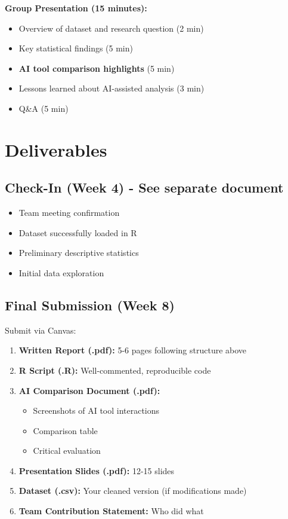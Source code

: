 \documentclass[11pt]{article}
\begin{document}
\textbf{Group Presentation (15 minutes):}
\begin{itemize}
\item Overview of dataset and research question (2 min)
\item Key statistical findings (5 min)
\item \textbf{AI tool comparison highlights} (5 min)
\item Lessons learned about AI-assisted analysis (3 min)
\item Q\&A (5 min)
\end{itemize}

\section{Deliverables}

\subsection{Check-In (Week 4) - See separate document}
\begin{itemize}
\item Team meeting confirmation
\item Dataset successfully loaded in R
\item Preliminary descriptive statistics
\item Initial data exploration
\end{itemize}

\subsection{Final Submission (Week 8)}

Submit via Canvas:

\begin{enumerate}
\item \textbf{Written Report (.pdf):} 5-6 pages following structure above
\item \textbf{R Script (.R):} Well-commented, reproducible code
\item \textbf{AI Comparison Document (.pdf):}
   \begin{itemize}
   \item Screenshots of AI tool interactions
   \item Comparison table
   \item Critical evaluation
   \end{itemize}
\item \textbf{Presentation Slides (.pdf):} 12-15 slides
\item \textbf{Dataset (.csv):} Your cleaned version (if modifications made)
\item \textbf{Team Contribution Statement:} Who did what
\end{enumerate}
\end{document}
